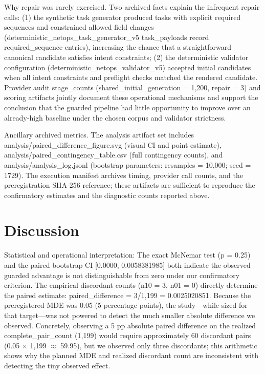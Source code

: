 \documentclass[conference]{IEEEtran}
\begin{document}
Why repair was rarely exercised. Two archived facts explain the infrequent repair calls: (1) the synthetic task generator produced tasks with explicit required sequences and constrained allowed field changes (deterministic\_netops\_task\_generator\_v5 task\_payloads record required\_sequence entries), increasing the chance that a straightforward canonical candidate satisfies intent constraints; (2) the deterministic validator configuration (deterministic\_netops\_validator\_v5) accepted initial candidates when all intent constraints and preflight checks matched the rendered candidate. Provider audit stage\_counts (shared\_initial\_generation = 1,200, repair = 3) and scoring artifacts jointly document these operational mechanisms and support the conclusion that the guarded pipeline had little opportunity to improve over an already‑high baseline under the chosen corpus and validator strictness.

Ancillary archived metrics. The analysis artifact set includes analysis/paired\_difference\_figure.svg (visual CI and point estimate), analysis/paired\_contingency\_table.csv (full contingency counts), and analysis/analysis\_log.jsonl (bootstrap parameters: resamples = 10,000; seed = 1729). The execution manifest archives timing, provider call counts, and the preregistration SHA‑256 reference; these artifacts are sufficient to reproduce the confirmatory estimates and the diagnostic counts reported above.

\section{Discussion}
Statistical and operational interpretation: The exact McNemar test (p = 0.25) and the paired bootstrap CI [0.0000, 0.0058381985] both indicate the observed guarded advantage is not distinguishable from zero under our confirmatory criterion. The empirical discordant counts (n10 = 3, n01 = 0) directly determine the paired estimate: paired\_difference = 3/1,199 = 0.0025020851. Because the preregistered MDE was 0.05 (5 percentage points), the study---while sized for that target---was not powered to detect the much smaller absolute difference we observed. Concretely, observing a 5 pp absolute paired difference on the realized complete\_pair\_count (1,199) would require approximately 60 discordant pairs (0.05 \ensuremath{\times} 1,199 \ensuremath{\approx} 59.95), but we observed only three discordants; this arithmetic shows why the planned MDE and realized discordant count are inconsistent with detecting the tiny observed effect.
\end{document}
